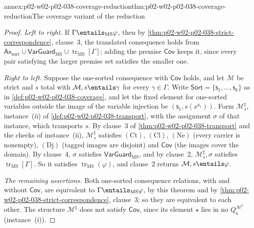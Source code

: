 \begin{annexitem}{annex:p02-w02-p02-038-coverage-reduction}{thm:p02-w02-p02-038-coverage-reduction}{The coverage variant of the reduction}
\begin{proof}
\emph{Left to right.}  If \(\Gamma\entails_{\mathrm{MS}}\varphi\), then by
\cref{thm:p02-w02-p02-038-strict-correspondence}, clause~3, the translated
consequence holds from \(\mathsf{Ax}_{\mathrm{sort}}\cup
\mathsf{VarGuard}_{\mathrm{MS}}\cup\operatorname{tr}_{\mathrm{MS}}[\Gamma]\);
adding the premise \(\mathsf{Cov}\) keeps it, since every pair satisfying
the larger premise set satisfies the smaller one.

\emph{Right to left.}  Suppose the one-sorted consequence with
\(\mathsf{Cov}\) holds, and let \(\mathcal M\) be strict and \(s\) total with
\(\mathcal M,s\entails\gamma\) for every \(\gamma\in\Gamma\).  Write
\(\mathsf{Sort}=\{\mathsf s_1,\ldots,\mathsf s_k\}\) as in
\cref{def:p02-w02-p02-038-coverage}, and let the fixed element for one-sorted
variables outside the image of the variable injection be
\((\mathsf s_1,s(x^{\mathsf s_1}))\).  Form \(\mathcal M^{\sharp}_{s}\),
instance~(ii) of \cref{def:p02-w02-p02-038-transport}, with the assignment
\(\sigma\) of that instance, which transports \(s\).  By clause~3 of
\cref{thm:p02-w02-p02-038-transport} and the checks of instance~(ii),
\(\mathcal M^{\sharp}_{s}\) satisfies \((\mathrm{Ct})\), \((\mathrm{Cl})\),
\((\mathrm{Ne})\) (every carrier is nonempty), \((\mathrm{Dj})\) (tagged images
are disjoint) and \(\mathsf{Cov}\) (the images cover the domain).  By
clause~4, \(\sigma\) satisfies \(\mathsf{VarGuard}_{\mathrm{MS}}\), and by
clause~2, \(\mathcal M^{\sharp}_{s},\sigma\) satisfies
\(\operatorname{tr}_{\mathrm{MS}}[\Gamma]\).  So it satisfies
\(\operatorname{tr}_{\mathrm{MS}}(\varphi)\), and clause~2 returns
\(\mathcal M,s\entails\varphi\).

\emph{The remaining assertions.}  Both one-sorted consequence relations, with
and without \(\mathsf{Cov}\), are equivalent to
\(\Gamma\entails_{\mathrm{MS}}\varphi\), by this theorem and by
\cref{thm:p02-w02-p02-038-strict-correspondence}, clause~3; so they are
equivalent to each other.  The structure \(\mathcal M^{\sharp}\) does not
satisfy \(\mathsf{Cov}\), since its element \(\star\) lies in no
\(Q_{\mathsf s}^{\mathcal M^{\sharp}}\) (instance~(i)).
\end{proof}
\end{annexitem}

